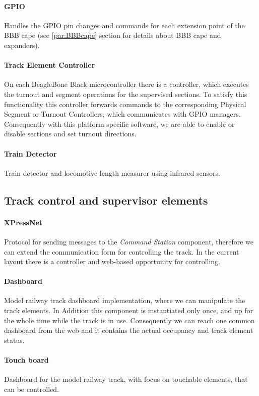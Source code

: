 \paragraph{GPIO}
Handles the GPIO pin changes and commands for each extension point of the BBB cape (see \ref{par:BBBcape} section for details about BBB cape and expanders).
\paragraph{Track Element Controller}
On each BeagleBone Black microcontroller there is a controller, which executes the turnout and segment operations for the supervised sections. To satisfy this functionality this controller forwards commands to the corresponding Physical Segment or Turnout Controllers, which communicates with GPIO managers. Consequently with this platform specific software, we are able to enable or disable sections and set turnout directions.
\paragraph{Train Detector}
Train detector and locomotive length measurer using infrared sensors.

\subsection{Track control and supervisor elements}
\paragraph{XPressNet}
Protocol for sending messages to the \textit{Command Station} component, therefore we can extend the communication form for controlling the track. In the current layout there is a controller and web-based opportunity for controlling.
\paragraph{Dashboard}
Model railway track dashboard implementation, where we can manipulate the track elements. In Addition this component is instantiated only once, and up for the whole time while the track is in use. Consequently we can reach one common dashboard from the web and it contains the actual occupancy and track element status.
\paragraph{Touch board}
Dashboard for the model railway track, with focus on touchable elements, that can be controlled.
